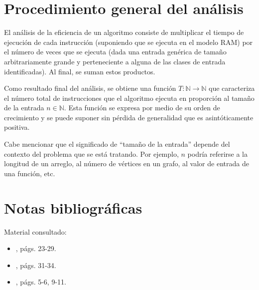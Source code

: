 \section{Procedimiento general del análisis}

El análisis de la eficiencia de un algoritmo consiste de multiplicar
el tiempo de ejecución de cada instrucción (suponiendo que se ejecuta
en el modelo RAM) por el número de veces que se ejecuta (dada una
entrada genérica de tamaño arbitrariamente grande y perteneciente
a alguna de las clases de entrada identificadas). Al final, se suman
estos productos. 

Como resultado final del análisis, se obtiene una función $T:\mathbb{N}\to\mathbb{N}$
que caracteriza el número total de instrucciones que el algoritmo ejecuta
en proporción al tamaño de la entrada $n\in\mathbb{N}$. Esta función
se expresa por medio de su orden de crecimiento y se puede suponer
sin pérdida de generalidad que es asintóticamente positiva. 

Cabe mencionar que el significado de ``tamaño de la entrada'' depende
del contexto del problema que se está tratando. Por ejemplo, $n$
podría referirse a la longitud de un arreglo, al número de vértices
en un grafo, al valor de entrada de una función, etc.

\section*{Notas bibliográficas}

Material consultado:
\begin{itemize}
    \item \textcite{cormen_introduction_2009}, págs. 23-29.
    \item \textcite{skiena_algorithm_2012}, págs. 31-34.
    \item \textcite{goodrich_algorithm_2001}, págs. 5-6, 9-11.
\end{itemize}

